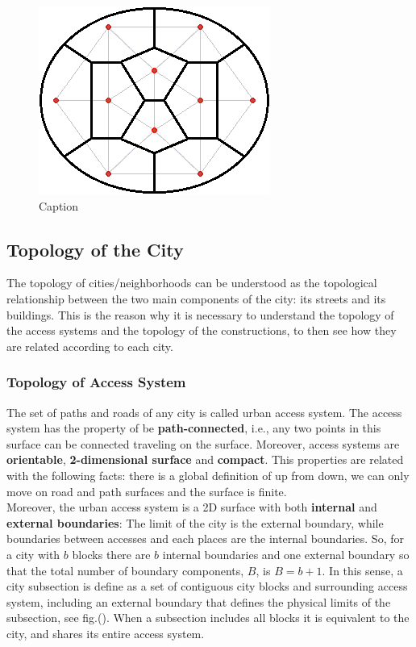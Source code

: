 \documentclass[10pt]{article}
\begin{document}
\begin{figure}[H]
    \centering
		\includegraphics[scale=0.75]{images/Birkhoff_diamond.png}
    \caption{Caption}
    \label{fig:my_label}
\end{figure}

\subsection{Topology of the City}
The topology of cities/neighborhoods can be understood as the topological relationship between the two main components of the city: its streets and its buildings. This is the reason why it is necessary to understand the topology of the access systems and the topology of the constructions, to then see how they are related according to each city.

\subsubsection{Topology of Access System}
The set of paths and roads of any city is called urban access system. The access system has the property of be \textbf{path-connected}, i.e., any two points in this surface can be connected traveling on the surface. Moreover, access systems are \textbf{orientable}, \textbf{2-dimensional surface} and \textbf{compact}. This properties are related with the following facts: there is a global definition of up from down, we can only move on road and path surfaces and the surface is finite.\\

Moreover, the urban access system is a 2D surface with both \textbf{internal} and \textbf{external boundaries}: The limit of the city is the external boundary, while boundaries between accesses and each places are the internal boundaries. So, for a city with $b$ blocks there are $b$ internal boundaries and one external boundary so that the total number of boundary components, $B$, is $B = b+1$. In this sense, a city subsection is define as a set of contiguous city blocks and surrounding access system, including an external boundary that defines the physical limits of the subsection, see fig.(). When a subsection includes all blocks it is equivalent to the city, and shares its entire access system.\\
\end{document}
